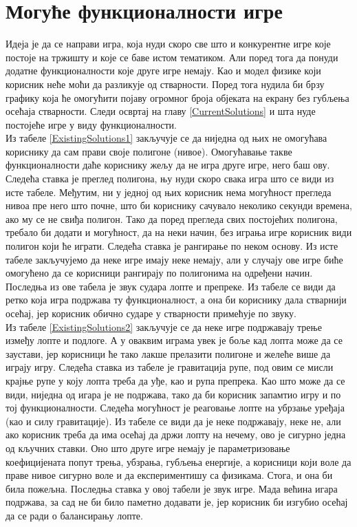 \chapter{Могуће функционалности игре}\label{GameProblem}

Идеја је да се направи игра, која нуди скоро све што и конкурентне игре које постоје на тржишту и које се баве истом тематиком. Али поред тога да понуди  додатне функционалности које друге игре немају. Као и модел физике који корисник неће моћи да разликује од стварности. Поред тога нудила би брзу графику која ће омогућити појаву огромног броја објеката на екрану без губљења осећаја стварности. Следи освртај на главу \ref{CurrentSolutions} и шта нуде постојеће игре у виду функционалности.
\\ \indent
 Из табеле \ref{ExistingSolutions1} закључује се да ниједна од њих не омогућава кориснику да сам прави своје полигоне (нивое). Омогућавање такве функционалности даће кориснику жељу да не игра друге игре, него баш ову. Следећа ставка је преглед полигона, њу нуди скоро свака игра што се види из исте табеле. Међутим, ни у једној од њих корисник нема могућност прегледа нивоа пре него што почне, што би кориснику сачувало неколико секунди времена, ако му се не свиђа полигон. Тако да поред прегледа свих постојећих полигона, требало би додати и могућност, да на неки начин, без играња игре корисник види полигон који ће играти. Следећа ставка је рангирање по неком основу. Из исте табеле закључујемо да неке игре имају неке немају, али у случају ове игре биће омогућено да се корисници рангирају по полигонима на одређени начин. Последња из ове табела је звук судара лопте и препреке. Из табеле се види да ретко која игра подржава ту функционалност, а она би кориснику дала стварнији осећај, јер корисник обично сударе у стварности примећује по звуку.
\\ \indent
Из табеле \ref{ExistingSolutions2} закључује се да неке игре подржавају трење између лопте и подлоге. А у оваквим играма увек је боље кад лопта може да се заустави, јер корисници ће тако лакше прелазити полигоне и желеће више да играју игру. Следећа ставка из табеле је гравитација рупе, под овим се мисли крајње рупе у коју лопта треба да уђе, као и рупа препрека. Као што може да се види, ниједна од игара је не подржава, тако да би корисник запамтио игру и по тој функционалности. Следећа могућност је реаговање лопте на убрзање уређаја (као и силу гравитације). Из табеле се види да је неке подржавају, неке не, али ако корисник треба да има осећај да држи лопту на нечему, ово је сигурно једна од кључних ставки. Оно што друге игре немају је параметризовање коефицијената попут трења, убзрања, губљења енергије, а корисници који воле да праве нивое сигурно воле и да експериментишу са физикама. Стога, и она би била пожељна. Последња ставка у овој табели је звук игре. Мада већина игара подржава, за сад не би било паметно додавати је, јер корисник би изгубио осећај да се ради о балансирању лопте. 
